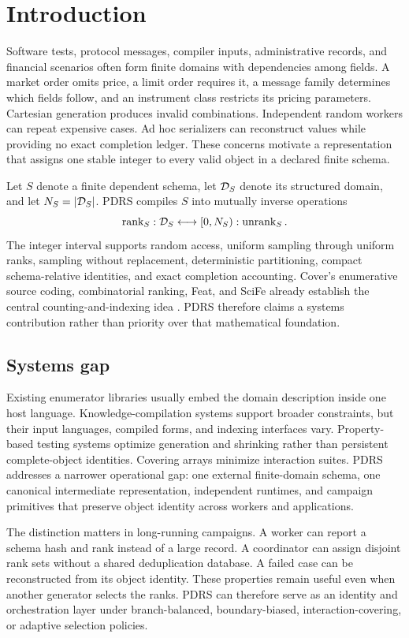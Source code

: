 \section{Introduction}
Software tests, protocol messages, compiler inputs, administrative records, and financial scenarios often form finite domains with dependencies among fields. A market order omits price, a limit order requires it, a message family determines which fields follow, and an instrument class restricts its pricing parameters. Cartesian generation produces invalid combinations. Independent random workers can repeat expensive cases. Ad hoc serializers can reconstruct values while providing no exact completion ledger. These concerns motivate a representation that assigns one stable integer to every valid object in a declared finite schema.

Let \(S\) denote a finite dependent schema, let \(\mathcal{D}_S\) denote its structured domain, and let \(N_S=|\mathcal{D}_S|\). PDRS compiles \(S\) into mutually inverse operations
\begin{equation}
  \operatorname{rank}_S : \mathcal{D}_S \longleftrightarrow [0,N_S) : \operatorname{unrank}_S.
\end{equation}
The integer interval supports random access, uniform sampling through uniform ranks, sampling without replacement, deterministic partitioning, compact schema-relative identities, and exact completion accounting. Cover's enumerative source coding, combinatorial ranking, Feat, and SciFe already establish the central counting-and-indexing idea \cite{cover1973,nijenhuis1978,feat2012,scife2015}. PDRS therefore claims a systems contribution rather than priority over that mathematical foundation.

\subsection{Systems gap}
Existing enumerator libraries usually embed the domain description inside one host language. Knowledge-compilation systems support broader constraints, but their input languages, compiled forms, and indexing interfaces vary. Property-based testing systems optimize generation and shrinking rather than persistent complete-object identities. Covering arrays minimize interaction suites. PDRS addresses a narrower operational gap: one external finite-domain schema, one canonical intermediate representation, independent runtimes, and campaign primitives that preserve object identity across workers and applications.

The distinction matters in long-running campaigns. A worker can report a schema hash and rank instead of a large record. A coordinator can assign disjoint rank sets without a shared deduplication database. A failed case can be reconstructed from its object identity. These properties remain useful even when another generator selects the ranks. PDRS can therefore serve as an identity and orchestration layer under branch-balanced, boundary-biased, interaction-covering, or adaptive selection policies.

